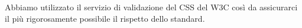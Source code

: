 Abbiamo utilizzato il servizio di validazione del CSS del W3C così da assicurarci il più rigorosamente possibile il rispetto dello standard.